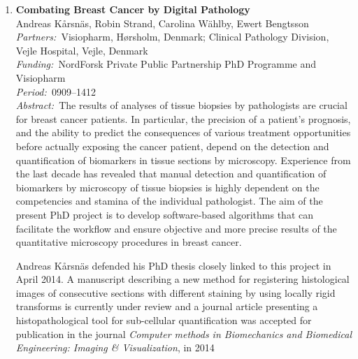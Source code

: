 \documentclass[10pt, a4paper]{article}
\newcommand{\aabstract}[1]{\emph{Abstract:~}#1}
\newcommand{\ffunding}[1]{\emph{Funding:~}#1\\}
\newcommand{\ppartners}[1]{\emph{Partners:~}#1\\}
\newcommand{\pperiod}[1]{\emph{Period:~}#1\\}
\begin{document}
{\begin{enumerate}
{Generating sperm in seminiferous tubules is a cyclic process, during which various generations of germ cells in the epithelial layer undergo a series of developmental steps. This cycle is typically subdivided into 12 different stages. We are developing a texture-based classification method to determine each tubule's stage. We are able to distinguish consistently stages if they are grouped into five classes (Figure \ref{fig:malereprod}).}

\begin{figure}[h]
\centering %
\texttt{[image: figures/research/5class.pdf]}
 \caption{Cross sections of seminiferous tubules representative for	the five classes we can distinguish consistently. Differences are mostly in the shape of the nuclei (stained in brown).}
 \label{fig:malereprod}
 \end{figure}


\item %
\label{proj:CombatingCancer}
\textbf{Combating Breast Cancer by Digital Pathology}\\
Andreas K{\aa}rsn\"{a}s, Robin Strand, Carolina W\"{a}hlby, Ewert Bengtsson\\
\ppartners{Visiopharm, H{\o}rsholm, Denmark; Clinical Pathology Division, Vejle Hospital, Vejle, Denmark}
\ffunding{NordForsk Private Public Partnership PhD Programme and Visiopharm}
\pperiod{0909--1412}
\aabstract{The results of analyses of tissue biopsies by pathologists are crucial for breast cancer patients. In particular, the precision of a patient's prognosis, and the ability to predict the consequences of various treatment opportunities before actually exposing the cancer patient, depend on the detection and quantification of biomarkers in tissue sections by microscopy. Experience from the last decade has revealed that manual detection and quantification of biomarkers by microscopy of tissue biopsies is highly dependent on the competencies and stamina of the individual pathologist. The aim of the present PhD project is to develop software-based algorithms that can facilitate the workflow and ensure objective and more precise results of the quantitative microscopy procedures in breast cancer.
	
Andreas K{\aa}rsn\"{a}s defended his PhD thesis closely linked to this project in April 2014. A manuscript describing a new method for registering histological images of consecutive sections with different staining by using locally rigid transforms is currently under review and a journal article presenting a histopathological tool for sub-cellular quantification was accepted for publication in the journal \textit{Computer methods in Biomechanics and Biomedical Engineering: Imaging \& Visualization}, in 2014}


\end{enumerate}}
\end{document}
